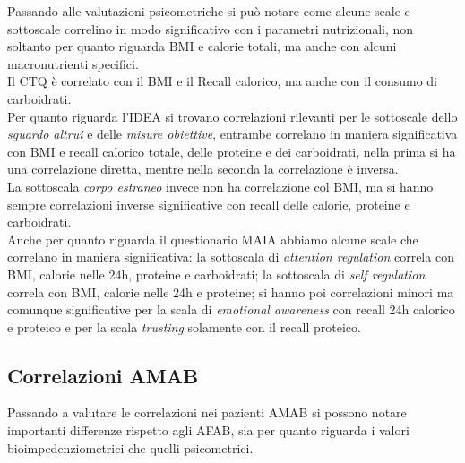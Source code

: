 \documentclass[12pt]{article}
\begin{document}
Passando alle valutazioni psicometriche si può notare come alcune scale e sottoscale correlino in modo significativo con i parametri nutrizionali, non soltanto per quanto riguarda BMI e calorie totali, ma anche con alcuni macronutrienti specifici. \\
Il CTQ è correlato con il BMI e il Recall calorico, ma anche con il consumo di carboidrati. \\
Per quanto riguarda l'IDEA si trovano correlazioni rilevanti per le sottoscale dello \emph{sguardo altrui} e delle \emph{misure obiettive}, entrambe correlano in maniera significativa con BMI e recall calorico totale, delle proteine e dei carboidrati, nella prima si ha una correlazione diretta, mentre nella seconda la correlazione è inversa. \\
La sottoscala \emph{corpo estraneo} invece non ha correlazione col BMI, ma si hanno sempre correlazioni inverse significative con recall delle calorie, proteine e carboidrati. \\
Anche per quanto riguarda il questionario MAIA abbiamo alcune scale che correlano in maniera significativa: la sottoscala di \emph{attention regulation} correla con BMI, calorie nelle 24h, proteine e carboidrati; la sottoscala di \emph{self regulation} correla con BMI, calorie nelle 24h e proteine; si hanno poi correlazioni minori ma comunque significative per la scala di \emph{emotional awareness} con recall 24h calorico e proteico e per la scala \emph{trusting} solamente con il recall proteico.
\subsection{Correlazioni AMAB}
\label{sec:orgd59a5a0}
Passando a valutare le correlazioni nei pazienti AMAB si possono notare importanti differenze rispetto agli AFAB, sia per quanto riguarda i valori bioimpedenziometrici che quelli psicometrici.

\begin{table}[H]
    \centering
    \caption{Correlazioni tra valori nutrizionali e BIA nei pazienti AMAB}
    \vspace*{0.2em}
{\renewcommand{\arraystretch}{2}%
}
    \label{tab:my_label}
\end{table}
\end{document}
